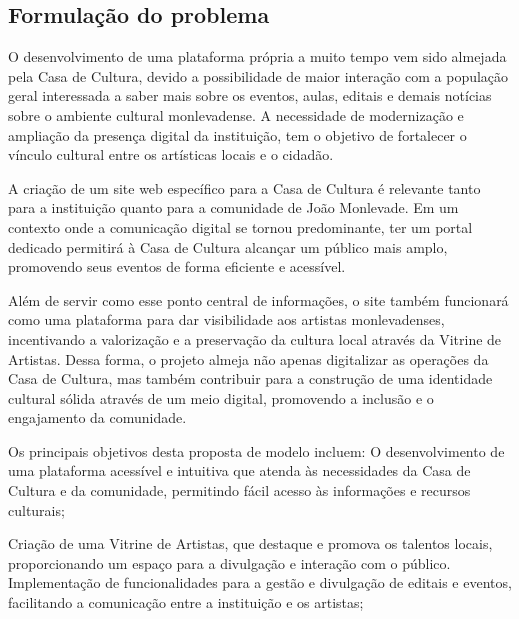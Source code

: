\subsection{Formulação do problema}



O desenvolvimento de uma plataforma própria a muito tempo vem sido almejada pela Casa de Cultura, devido a possibilidade de maior interação com a população geral interessada a saber mais sobre os eventos, aulas, editais e demais notícias sobre o ambiente cultural monlevadense. A necessidade de modernização e ampliação da presença digital da instituição, tem o objetivo de fortalecer o vínculo cultural entre os artísticas locais e o cidadão.

A criação de um site web específico para a Casa de Cultura é relevante tanto para a instituição quanto para a comunidade de João Monlevade. Em um contexto onde a comunicação digital se tornou predominante, ter um portal dedicado permitirá à Casa de Cultura alcançar um público mais amplo, promovendo seus eventos de forma eficiente e acessível. 

Além de servir como esse ponto central de informações, o site também funcionará como uma plataforma para dar visibilidade aos artistas monlevadenses, incentivando a valorização e a preservação da cultura local através da Vitrine de Artistas. Dessa forma, o projeto almeja não apenas digitalizar as operações da Casa de Cultura, mas também contribuir para a construção de uma identidade cultural sólida através de um meio digital, promovendo a inclusão e o engajamento da comunidade.

Os principais objetivos desta proposta de modelo incluem: O desenvolvimento de uma plataforma acessível e intuitiva que atenda às necessidades da Casa de Cultura e da comunidade, permitindo fácil acesso às informações e recursos culturais;

Criação de uma Vitrine de Artistas, que destaque e promova os talentos locais, proporcionando um espaço para a divulgação e interação com o público.
Implementação de funcionalidades para a gestão e divulgação de editais e eventos, facilitando a comunicação entre a instituição e os artistas;

